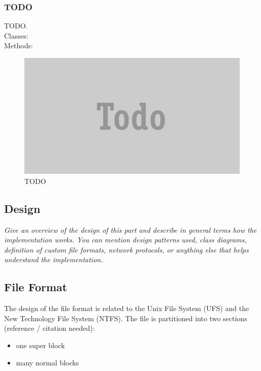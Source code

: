 \documentclass[JCDReport.tex]{subfiles}
\begin{document}
% 
\subsubsection{TODO}
TODO.\\
Classes:\\
Methods:\\
\begin{figure}[h!]
	\centering
	\includegraphics[scale=1]{Images/todo.png} 
	\caption{TODO}
\end{figure}




\subsection{Design}

\emph{Give an overview of the design of this part and describe in general terms how the implementation works. You can mention design patterns used, class diagrams, definition of custom file formats, network protocols, or anything else that helps understand the implementation.}

\subsection{File Format}

The design of the file format is related to the Unix File System (UFS) and the New Technology File System (NTFS). The file is partitioned into two sections (reference / citation needed):

\begin{itemize}
  \item one super block
  \item many normal blocks
\end{itemize}
\end{document}
